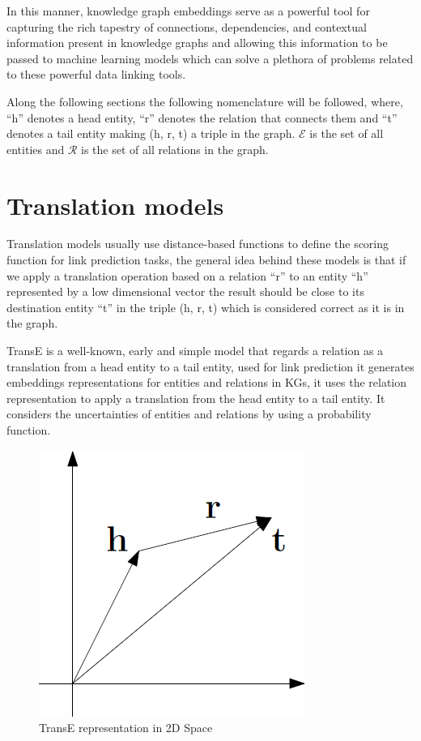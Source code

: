 In this manner, knowledge graph embeddings serve as a powerful tool for capturing the rich tapestry of connections, dependencies, and contextual information present in knowledge graphs and allowing this information to be passed to machine learning models which can solve a plethora of problems related to these powerful data linking tools.

Along the following sections the following nomenclature will be followed, where, ``h'' denotes a head entity, ``r'' denotes the relation that connects them and ``t'' denotes a tail entity making (h, r, t) a triple in the graph. $\mathcal{E}$ is the set of all entities and $\mathcal{R}$ is the set of all relations in the graph.

\section{Translation models}\label{sec:emb-translations}


Translation models usually use distance-based functions to define the scoring function for link prediction tasks, the general idea behind these models is that if we apply a translation operation based on a relation ``r'' to an entity ``h'' represented by a low dimensional vector the result should be close to its destination entity ``t'' in the triple (h, r, t) which is considered correct as it is in the graph.

TransE \cite{bordes2013translating} is a well-known, early and simple model that regards a relation as a translation from a head entity to a tail entity, used for link prediction it generates embeddings representations for entities and relations in KGs, it uses the relation representation to apply a translation from the head entity to a tail entity. It considers the uncertainties of entities and relations by using a probability function. 

\begin{figure}[!htp]
    \centering
    \includegraphics[width=.4\textwidth]{fig/embeddings/TransE.png}
    \caption{TransE \cite{bordes2013translating} representation in 2D Space}
    \label{fig:emb-transE}
\end{figure}

